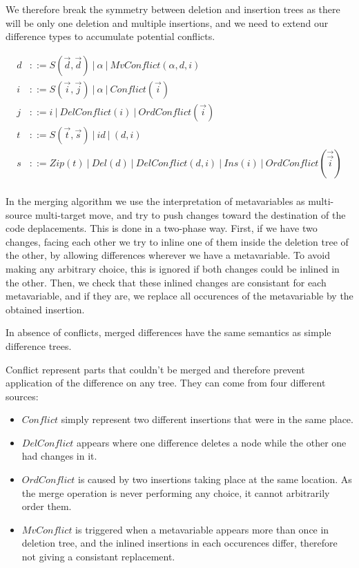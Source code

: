 \documentclass[a4paper,10pt]{article}
\newcommand{\typsep}{\ |\ }
\begin{document}
We therefore break the symmetry between deletion and insertion trees as there will be only one deletion and multiple insertions, and we need to extend our difference types to accumulate potential conflicts.

\begin{align*}
d &::= S(\overrightarrow{d}, \overrightarrow{d}) \typsep \alpha \typsep MvConflict(\alpha, d, i) \\
i &::= S(\overrightarrow{i}, \overrightarrow{j}) \typsep \alpha \typsep Conflict(\overrightarrow{i})\\
j &::= i \typsep DelConflict(i) \typsep OrdConflict(\overrightarrow{i})\\
t &::= S(\overrightarrow{t}, \overrightarrow{s}) \typsep id \typsep (d, i)\\
s &::= Zip(t) \typsep Del(d) \typsep DelConflict(d, i) \typsep Ins(i) \typsep OrdConflict(\overrightarrow{\overrightarrow{i}})\\
\end{align*}

In the merging algorithm we use the interpretation of metavariables as multi-source multi-target move, and try to push changes toward the destination of the code deplacements.
This is done in a two-phase way. First, if we have two changes, facing each other we try to inline one of them inside the deletion tree of the other, by allowing differences wherever we have a metavariable. To avoid making any arbitrary choice, this is ignored if both changes could be inlined in the other. Then, we check that these inlined changes are consistant for each metavariable, and if they are, we replace all occurences of the metavariable by the obtained insertion.

In absence of conflicts, merged differences have the same semantics as simple difference trees.

Conflict represent parts that couldn't be merged and therefore prevent application of the difference on any tree. They can come from four different sources:
\begin{itemize}
  \item $Conflict$ simply represent two different insertions that were in the same place.
  \item $DelConflict$ appears where one difference deletes a node while the other one had changes in it.
  \item $OrdConflict$ is caused by two insertions taking place at the same location. As the merge operation is never performing any choice, it cannot arbitrarily order them.
  \item $MvConflict$ is triggered when a metavariable appears more than once in deletion tree, and the inlined insertions in each occurences differ, therefore not giving a consistant replacement.
\end{itemize}
\end{document}
